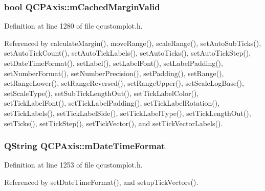 \hypertarget{class_q_c_p_axis_a2cde37b6e385f47e11322df4ac1b0e9b}{}
\subsubsection[{m\+Cached\+Margin\+Valid}]{\setlength{\rightskip}{0pt plus 5cm}bool Q\+C\+P\+Axis\+::m\+Cached\+Margin\+Valid\hspace{0.3cm}{\ttfamily [protected]}}\label{class_q_c_p_axis_a2cde37b6e385f47e11322df4ac1b0e9b}


Definition at line 1280 of file qcustomplot.\+h.



Referenced by calculate\+Margin(), move\+Range(), scale\+Range(), set\+Auto\+Sub\+Ticks(), set\+Auto\+Tick\+Count(), set\+Auto\+Tick\+Labels(), set\+Auto\+Ticks(), set\+Auto\+Tick\+Step(), set\+Date\+Time\+Format(), set\+Label(), set\+Label\+Font(), set\+Label\+Padding(), set\+Number\+Format(), set\+Number\+Precision(), set\+Padding(), set\+Range(), set\+Range\+Lower(), set\+Range\+Reversed(), set\+Range\+Upper(), set\+Scale\+Log\+Base(), set\+Scale\+Type(), set\+Sub\+Tick\+Length\+Out(), set\+Tick\+Label\+Color(), set\+Tick\+Label\+Font(), set\+Tick\+Label\+Padding(), set\+Tick\+Label\+Rotation(), set\+Tick\+Labels(), set\+Tick\+Label\+Side(), set\+Tick\+Label\+Type(), set\+Tick\+Length\+Out(), set\+Ticks(), set\+Tick\+Step(), set\+Tick\+Vector(), and set\+Tick\+Vector\+Labels().

\hypertarget{class_q_c_p_axis_a0b7ad83550d71daab4cfee2918e168e0}{}
\subsubsection[{m\+Date\+Time\+Format}]{\setlength{\rightskip}{0pt plus 5cm}Q\+String Q\+C\+P\+Axis\+::m\+Date\+Time\+Format\hspace{0.3cm}{\ttfamily [protected]}}\label{class_q_c_p_axis_a0b7ad83550d71daab4cfee2918e168e0}


Definition at line 1253 of file qcustomplot.\+h.



Referenced by set\+Date\+Time\+Format(), and setup\+Tick\+Vectors().

